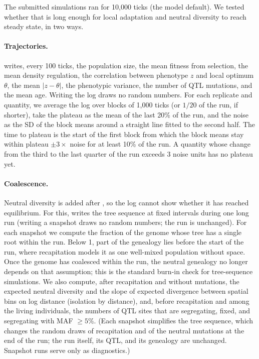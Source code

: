 The submitted simulations ran for 10,000 ticks (the model default). We
tested whether that is long enough for local adaptation and neutral
diversity to reach steady state, in two ways.

\paragraph{Trajectories.} \slim writes, every 100 ticks, the population
size, the mean fitness from selection, the mean density regulation, the
correlation between phenotype $z$ and local optimum $\theta$, the mean
$|z-\theta|$, the phenotypic variance, the number of QTL mutations, and the
mean age. Writing the log draws no random numbers. For each replicate and
quantity, we average the log over blocks of 1,000 ticks (or $1/20$ of the
run, if shorter), take the plateau as the mean of the last 20\% of the run,
and the noise as the SD of the block means around a straight line fitted
to the second half. The time to plateau is the start of the first block
from which the block means stay within plateau $\pm 3\times$ noise for at
least 10\% of the run. A quantity whose change from the third to the last
quarter of the run exceeds 3 noise units has no plateau yet.

\paragraph{Coalescence.} Neutral diversity is added after \slim, so the
log cannot show whether it has reached equilibrium. For this, \slim writes
the tree sequence at fixed intervals during one long run (writing a
snapshot draws no random numbers; the \slim run is unchanged). For each
snapshot we compute the fraction of the genome whose tree has a single root
within the run. Below 1, part of the genealogy lies before the start of the
run, where recapitation models it as one well-mixed population without
space. Once the genome has coalesced within the run, the neutral genealogy
no longer depends on that assumption; this is the standard burn-in check
for tree-sequence simulations. We also compute, after recapitation and
without mutations, the expected neutral diversity and the slope of expected
divergence between spatial bins on log distance (isolation by distance),
and, before recapitation and among the living individuals, the numbers of
QTL sites that are segregating, fixed, and segregating with MAF $\geq 5\%$.
(Each snapshot simplifies the tree sequence, which changes the random
draws of recapitation and of the neutral mutations at the end of the run;
the \slim run itself, its QTL, and its genealogy are unchanged. Snapshot
runs serve only as diagnostics.)

